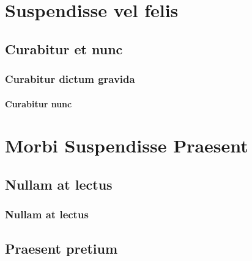 \documentclass[
	12pt,				%
    oneside,            %
	a4paper,			%
	english,			%
	brazilian,		    %
	]{AcademicoUFT}
\begin{document}
\chapter{Suspendisse vel felis}
\lipsum[121]

\section{Curabitur et nunc}
\lipsum[8] %

\subsection{Curabitur dictum gravida}
\lipsum[5]

\subsubsection{Curabitur nunc}
\lipsum[6]

\lipsum[111]





\chapter{Morbi Suspendisse Praesent}

\section{Nullam at lectus}
\lipsum[10] %
\subsection{Nullam at lectus}
\lipsum[11] %


\section{Praesent pretium}
\lipsum[12] %




\end{document}
